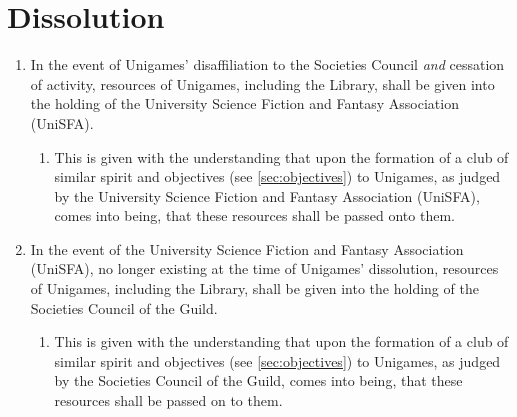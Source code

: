 \documentclass[a4paper]{article}
\begin{document}
\section{Dissolution} \label{sec:dissolution}
\begin{enumerate}
    \item In the event of Unigames' disaffiliation to the Societies Council \emph{and} cessation of activity, resources of Unigames, including the Library, shall be given into the holding of the University Science Fiction and Fantasy Association (UniSFA).
          \begin{enumerate}
              \item This is given with the understanding that upon the formation of a club of similar spirit and objectives (see \cref{sec:objectives}) to Unigames, as judged by the University Science Fiction and Fantasy Association (UniSFA), comes into being, that these resources shall be passed onto them.
          \end{enumerate}
    \item In the event of the University Science Fiction and Fantasy Association (UniSFA), no longer existing at the time of Unigames' dissolution, resources of Unigames, including the Library, shall be given into the holding of the Societies Council of the Guild.
          \begin{enumerate}
              \item This is given with the understanding that upon the formation of a club of similar spirit and objectives (see \cref{sec:objectives}) to Unigames, as judged by the Societies Council of the Guild, comes into being, that these resources shall be passed on to them.
          \end{enumerate}
\end{enumerate}
\end{document}
